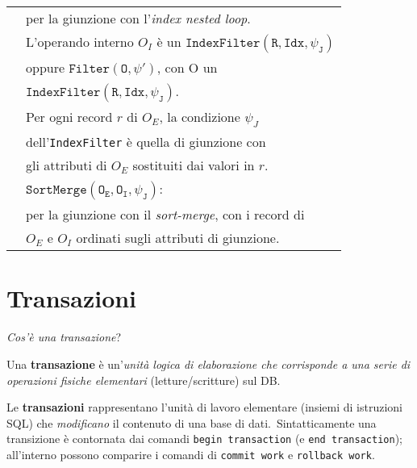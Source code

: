 \begin{table}[H]
\begin{tabular}{|c|l|}
		                                                & per la giunzione con l'\textit{index nested loop}.                    \\
		                                                & L'operando interno $O_I$ è un $\mathtt{IndexFilter(R, Idx, \psi_J)}$  \\
		                                                & oppure $\mathtt{Filter(O,\psi')}$, con O un                           \\
		                                                & $\mathtt{IndexFilter(R, Idx, \psi_J)}$.                               \\
		                                                & Per ogni record $r$ di $O_E$, la condizione $\psi_J$                  \\
		                                                & dell'\texttt{IndexFilter} è quella di giunzione con                   \\
		                                                & gli attributi di $O_E$ sostituiti dai valori in $r$.                  \\\cline{2-2}
		                                                & $\mathtt{SortMerge(O_E, O_I, \psi_J)}$:                               \\
		                                                & per la giunzione con il \textit{sort-merge}, con i record di          \\
		                                                & $O_E$ e $O_I$ ordinati sugli attributi di giunzione.                  \\
		\hline
	\end{tabular}
\end{table}

\section{Transazioni}
\begin{center}
	\textit{Cos'è una transazione}?
\end{center}

\begin{definition}
	Una \textbf{transazione} è un'\textit{unità logica di elaborazione che corrisponde a una serie di operazioni fisiche elementari} (letture/scritture) sul DB.
\end{definition}

\noindent Le \textbf{transazioni} rappresentano l'unità di lavoro elementare (insiemi di istruzioni SQL) che \textit{modificano} il contenuto di una base di dati.\
Sintatticamente una transizione è contornata dai comandi \texttt{begin transaction} (e \texttt{end transaction}); all'interno possono comparire i comandi di \texttt{commit work} e \texttt{rollback work}.\


